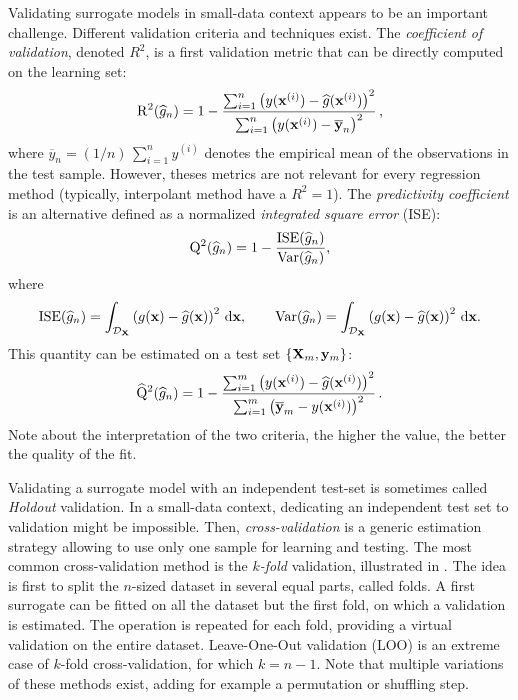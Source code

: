 Validating surrogate models in small-data context appears to be an important challenge. 
Different validation criteria and techniques exist. 
The \textit{coefficient of validation}, denoted $R^2$, is a first validation metric that can be directly computed on the learning set:
\begin{equation}
    \mathrm{R}^2(\widehat{g}_n) = 1 - \frac{ \sum_{i=1}^n  \left(y({\bf x}^{(i)}) - \widehat{g}({\bf x}^{(i)})\right)^2}{\sum_{i=1}^n \left(y({\bf x}^{(i)})-\overline{{\bf y}}_n\right)^2}\,,
\end{equation}
where $\overline{y}_n=(1/n)\,\sum_{i=1}^n y^{(i)}$ denotes the empirical mean of the observations in the test sample. 
However, theses metrics are not relevant for every regression method (typically, interpolant method have a $R^2=1$). 
The \textit{predictivity coefficient} is an alternative defined as a normalized \textit{integrated square error} (ISE): 
\begin{equation}
    \mathrm{Q}^2(\widehat{g}_n) = 1 - \frac{\mathrm{ISE}(\widehat{g}_n)}{\operatorname{Var}(\widehat{g}_n)}, 
\end{equation} 
where 
\begin{equation}
    \mathrm{ISE}(\widehat{g}_n) = \int_{\mathcal{D}_{{\bf X}}} \left(g({\bf x}) - \widehat{g}({\bf x})\right)^2 \, \mathrm{d}{\bf x}, \qquad
    \operatorname{Var}(\widehat{g}_n) = \int_{\mathcal{D}_{{\bf X}}} \left(g({\bf x}) - \widehat{g}({\bf x})\right)^2 \, \mathrm{d}{\bf x}.
\end{equation}
This quantity can be estimated on a test set $\left\{{\bf X}_m, {\bf y}_m\right\}$: 
\begin{equation}
    \widehat{\mathrm{Q}}^2(\widehat{g}_n) = 1 - \frac{ \sum_{i=1}^m  \left(y({\bf x}^{(i)}) - \widehat{g}({\bf x}^{(i)})\right)^2}{\sum_{i=1}^m \left(\overline{{\bf y}}_m - y({\bf x}^{(i)})\right)^2}\,.
\end{equation}
Note about the interpretation of the two criteria, the higher the value, the better the quality of the fit. 

Validating a surrogate model with an independent test-set is sometimes called \textit{Holdout} validation.
In a small-data context, dedicating an independent test set to validation might be impossible.
Then, \textit{cross-validation} is a generic estimation strategy allowing to use only one sample for learning and testing. 
The most common cross-validation method is the \textit{$k$-fold} validation, illustrated in . 
The idea is first to split the $n$-sized dataset in several equal parts, called folds. 
A first surrogate can be fitted on all the dataset but the first fold, on which a validation is estimated. 
The operation is repeated for each fold, providing a virtual validation on the entire dataset. 
Leave-One-Out validation (LOO) is an extreme case of $k$-fold cross-validation, for which $k=n-1$. 
Note that multiple variations of these methods exist, adding for example a permutation or shuffling step. 

